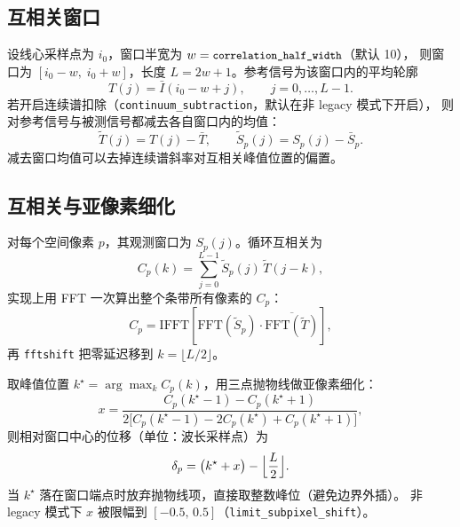 \documentclass[11pt,a4paper]{ctexart}
\newcommand{\code}[1]{\texttt{\small #1}}
\begin{document}
\subsection{互相关窗口}
设线心采样点为 $i_0$，窗口半宽为 $w=\code{correlation\_half\_width}$（默认 10），
则窗口为 $[i_0-w,\; i_0+w]$，长度 $L=2w+1$。参考信号为该窗口内的平均轮廓
\begin{equation}
  T(j) = \bar I(i_0-w+j), \qquad j = 0,\dots,L-1 .
\end{equation}
若开启连续谱扣除（\code{continuum\_subtraction}，默认在非 legacy 模式下开启），
则对参考信号与被测信号都减去各自窗口内的均值：
\begin{equation}
  \tilde T(j) = T(j) - \bar T, \qquad
  \tilde S_p(j) = S_p(j) - \bar S_p .
\end{equation}
减去窗口均值可以去掉连续谱斜率对互相关峰值位置的偏置。

\subsection{互相关与亚像素细化}
对每个空间像素 $p$，其观测窗口为 $S_p(j)$。循环互相关为
\begin{equation}
  C_p(k) = \sum_{j=0}^{L-1} \tilde S_p(j)\, \tilde T(j-k),
  \label{eq:cc}
\end{equation}
实现上用 FFT 一次算出整个条带所有像素的 $C_p$：
\begin{equation}
  C_p = \mathrm{IFFT}\!\left[\mathrm{FFT}(\tilde S_p)\cdot
        \overline{\mathrm{FFT}(\tilde T)}\right],
\end{equation}
再 \code{fftshift} 把零延迟移到 $k = \lfloor L/2 \rfloor$。

取峰值位置 $k^\star = \arg\max_k C_p(k)$，用三点抛物线做亚像素细化：
\begin{equation}
  x = \frac{C_p(k^\star-1) - C_p(k^\star+1)}
           {2\bigl[C_p(k^\star-1) - 2C_p(k^\star) + C_p(k^\star+1)\bigr]},
  \label{eq:parab}
\end{equation}
则相对窗口中心的位移（单位：波长采样点）为
\begin{equation}
  \delta_p = \bigl(k^\star + x\bigr) - \Bigl\lfloor \frac{L}{2} \Bigr\rfloor .
  \label{eq:disp}
\end{equation}
当 $k^\star$ 落在窗口端点时放弃抛物线项，直接取整数峰位（避免边界外插）。
非 legacy 模式下 $x$ 被限幅到 $[-0.5,\,0.5]$（\code{limit\_subpixel\_shift}）。
\end{document}
